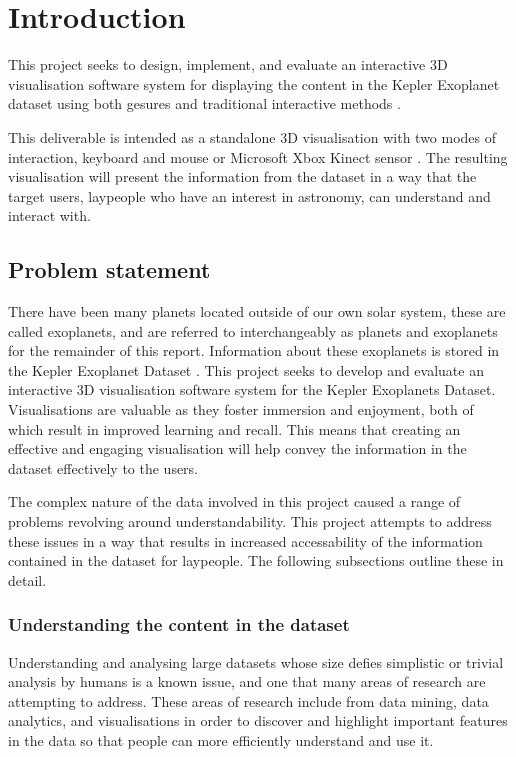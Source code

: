\chapter{Introduction}\label{C:intro}
This project seeks to design, implement, and evaluate an interactive 3D
visualisation software system for displaying the content in the Kepler
Exoplanet dataset using both gesures and traditional interactive methods
\cite{dataset}.


This deliverable is intended as a standalone
3D visualisation with two modes of interaction, keyboard and mouse or Microsoft
Xbox Kinect sensor \cite{kinect}. The resulting visualisation will present the
information from the dataset in a way that the target users, laypeople who have
an
interest in astronomy, can understand and interact with.
\section{Problem statement}
There have been many planets located outside of our own solar system,
these are called exoplanets, and are referred to interchangeably as planets and
exoplanets for the remainder of this report. Information about these exoplanets
is stored in the Kepler Exoplanet Dataset
\cite{dataset}. This project seeks to develop and evaluate an interactive 3D
visualisation software system for the Kepler Exoplanets Dataset. Visualisations
are valuable as they foster immersion and enjoyment, both of which result in
improved learning and recall. This means that
creating an effective and engaging visualisation will help convey the
information
in the dataset effectively to the users.

The complex nature of the data involved in this project caused a range of
problems revolving around understandability. This project
attempts to address these issues in a way that results in increased
accessability of the information contained in the dataset for laypeople. The
following subsections outline these in detail.

\subsection{Understanding the content in the dataset}
Understanding and analysing large datasets whose size defies simplistic or
trivial analysis by humans is a known issue, and one that many areas of research
are
attempting to address. These areas of research include from data mining, data
analytics, and visualisations in order to discover and highlight important
features in the data so that people can more efficiently understand and use it. 

